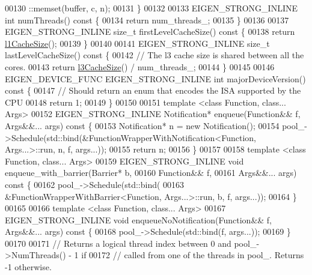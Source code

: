 \begin{DoxyCode}
00130     ::memset(buffer, c, n);
00131   \}
00132 
00133   EIGEN\_STRONG\_INLINE \textcolor{keywordtype}{int} numThreads()\textcolor{keyword}{ const }\{
00134     \textcolor{keywordflow}{return} num\_threads\_;
00135   \}
00136 
00137   EIGEN\_STRONG\_INLINE \textcolor{keywordtype}{size\_t} firstLevelCacheSize()\textcolor{keyword}{ const }\{
00138     \textcolor{keywordflow}{return} \hyperlink{namespace_eigen_a2669f89ff38296a38e6d973552eb4e33}{l1CacheSize}();
00139   \}
00140 
00141   EIGEN\_STRONG\_INLINE \textcolor{keywordtype}{size\_t} lastLevelCacheSize()\textcolor{keyword}{ const }\{
00142     \textcolor{comment}{// The l3 cache size is shared between all the cores.}
00143     \textcolor{keywordflow}{return} \hyperlink{namespace_eigen_ae2efa4852ea90c2d47b7dcec5b40ba2b}{l3CacheSize}() / num\_threads\_;
00144   \}
00145 
00146   EIGEN\_DEVICE\_FUNC EIGEN\_STRONG\_INLINE \textcolor{keywordtype}{int} majorDeviceVersion()\textcolor{keyword}{ const }\{
00147     \textcolor{comment}{// Should return an enum that encodes the ISA supported by the CPU}
00148     \textcolor{keywordflow}{return} 1;
00149   \}
00150 
00151   \textcolor{keyword}{template} <\textcolor{keyword}{class }Function, \textcolor{keyword}{class}... Args>
00152   EIGEN\_STRONG\_INLINE Notification* enqueue(Function&& f, Args&&... args)\textcolor{keyword}{ const }\{
00153     Notification* n = \textcolor{keyword}{new} Notification();
00154     pool\_->Schedule(std::bind(&FunctionWrapperWithNotification<Function, Args...>::run, n, f, args...));
00155     \textcolor{keywordflow}{return} n;
00156   \}
00157 
00158   \textcolor{keyword}{template} <\textcolor{keyword}{class }Function, \textcolor{keyword}{class}... Args>
00159   EIGEN\_STRONG\_INLINE \textcolor{keywordtype}{void} enqueue\_with\_barrier(Barrier* b,
00160                                                 Function&& f,
00161                                                 Args&&... args)\textcolor{keyword}{ const }\{
00162     pool\_->Schedule(std::bind(
00163         &FunctionWrapperWithBarrier<Function, Args...>::run, b, f, args...));
00164   \}
00165 
00166   \textcolor{keyword}{template} <\textcolor{keyword}{class }Function, \textcolor{keyword}{class}... Args>
00167   EIGEN\_STRONG\_INLINE \textcolor{keywordtype}{void} enqueueNoNotification(Function&& f, Args&&... args)\textcolor{keyword}{ const }\{
00168     pool\_->Schedule(std::bind(f, args...));
00169   \}
00170 
00171   \textcolor{comment}{// Returns a logical thread index between 0 and pool\_->NumThreads() - 1 if}
00172   \textcolor{comment}{// called from one of the threads in pool\_. Returns -1 otherwise.}

\end{DoxyCode}
